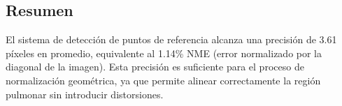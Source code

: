 \subsection{Resumen}
\label{subsec:resumen_landmarks}

El sistema de detección de puntos de referencia alcanza una precisión de 3.61 píxeles en promedio, equivalente al 1.14\% NME (error normalizado por la diagonal de la imagen). Esta precisión es suficiente para el proceso de normalización geométrica, ya que permite alinear correctamente la región pulmonar sin introducir distorsiones.
